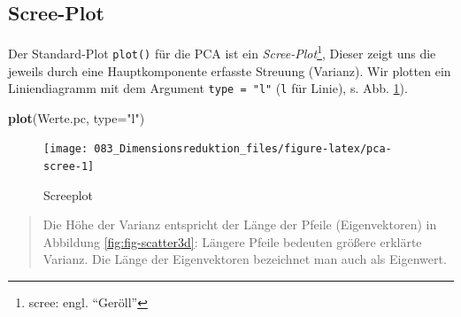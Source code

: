 \documentclass[12pt,ngerman,]{book}
\makeatletter
\newenvironment{Shaded}{\begin{snugshade}}{\end{snugshade}}
\newcommand{\KeywordTok}[1]{\textcolor[rgb]{0.13,0.29,0.53}{\textbf{#1}}}
\newcommand{\DataTypeTok}[1]{\textcolor[rgb]{0.13,0.29,0.53}{#1}}
\newcommand{\DecValTok}[1]{\textcolor[rgb]{0.00,0.00,0.81}{#1}}
\newcommand{\StringTok}[1]{\textcolor[rgb]{0.31,0.60,0.02}{#1}}
\newcommand{\CommentTok}[1]{\textcolor[rgb]{0.56,0.35,0.01}{\textit{#1}}}
\newcommand{\OperatorTok}[1]{\textcolor[rgb]{0.81,0.36,0.00}{\textbf{#1}}}
\newcommand{\NormalTok}[1]{#1}
\let\rmarkdownfootnote\footnote%
\def\footnote{\protect\rmarkdownfootnote}
\newenvironment{kframe}{%
\medskip{}
\setlength{\fboxsep}{.8em}
 \def\at@end@of@kframe{}%
 \ifinner\ifhmode%
  \def\at@end@of@kframe{\end{minipage}}%
  \begin{minipage}{\columnwidth}%
 \fi\fi%
 \def\FrameCommand##1{\hskip\@totalleftmargin \hskip-\fboxsep
 \colorbox{shadecolor}{##1}\hskip-\fboxsep
     \hskip-\linewidth \hskip-\@totalleftmargin \hskip\columnwidth}%
 \MakeFramed {\advance\hsize-\width
   \@totalleftmargin\z@ \linewidth\hsize
   \@setminipage}}%
 {\par\unskip\endMakeFramed%
 \at@end@of@kframe}
\renewenvironment{Shaded}{\begin{kframe}}{\end{kframe}}
\theoremstyle{definition}
\theoremstyle{definition}
\theoremstyle{remark}
\makeatother
\begin{document}
\begin{Shaded}
\end{Shaded}

\subsection{Scree-Plot}\label{scree-plot}

Der Standard-Plot \texttt{plot()} für die PCA ist ein
\emph{Scree-Plot}\footnote{scree: engl. ``Geröll''}, Dieser zeigt uns
die jeweils durch eine Hauptkomponente erfasste Streuung (Varianz). Wir
plotten ein Liniendiagramm mit dem Argument \texttt{type\ =\ "l"}
(\texttt{l} für Linie), s. Abb. \ref{fig:pca-scree}).

\begin{Shaded}
\begin{Highlighting}[]
\KeywordTok{plot}\NormalTok{(Werte.pc, }\DataTypeTok{type=}\StringTok{"l"}\NormalTok{)}
\end{Highlighting}
\end{Shaded}

\begin{figure}

{\centering \texttt{[image: 083\_Dimensionsreduktion\_files/figure-latex/pca-scree-1]} 

}

\caption{Screeplot}\label{fig:pca-scree}
\end{figure}

\begin{quote}
Die Höhe der Varianz entspricht der Länge der Pfeile (Eigenvektoren) in
Abbildung \ref{fig:fig-scatter3d}: Längere Pfeile bedeuten größere
erklärte Varianz. Die Länge der Eigenvektoren bezeichnet man auch als
Eigenwert.
\end{quote}
\end{document}
